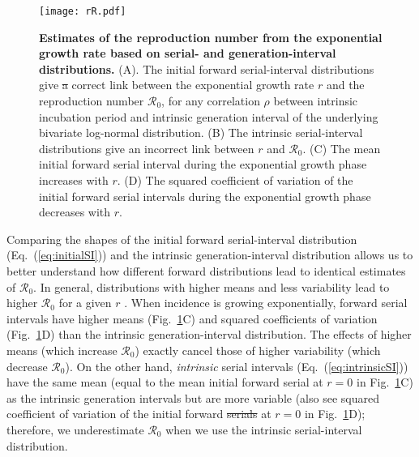 \documentclass[12pt]{article}
\newcommand{\eref}[1]{Eq.~(\ref{eq:#1})}
\newcommand{\fref}[1]{Fig.~\ref{fig:#1}}
\newcommand{\Rx}[1]{\ensuremath{{\mathcal R}_{#1}}\xspace}
\newcommand{\Ro}{\Rx{0}}
\providecommand{\DIFaddtex}[1]{{\protect\color{blue}\uwave{#1}}} %
\providecommand{\DIFdeltex}[1]{{\protect\color{red}\sout{#1}}}                      %
\providecommand{\DIFaddbegin}{} %
\providecommand{\DIFaddend}{} %
\providecommand{\DIFdelbegin}{} %
\providecommand{\DIFdelend}{} %
\providecommand{\DIFaddFL}[1]{\DIFadd{#1}} %
\providecommand{\DIFdelFL}[1]{\DIFdel{#1}} %
\providecommand{\DIFaddbeginFL}{} %
\providecommand{\DIFaddendFL}{} %
\providecommand{\DIFdelbeginFL}{} %
\providecommand{\DIFdelendFL}{} %
\providecommand{\DIFadd}[1]{\texorpdfstring{\DIFaddtex{#1}}{#1}} %
\providecommand{\DIFdel}[1]{\texorpdfstring{\DIFdeltex{#1}}{}} %
\newcommand{\DIFscaledelfig}{0.5}
\newlength{\DIFdelgraphicswidth} %
\newlength{\DIFdelgraphicsheight} %
\newcommand{\DIFaddincludegraphics}[2][]{{\color{blue}\fbox{\DIFOincludegraphics[#1]{#2}}}} %
\newcommand{\DIFdelincludegraphics}[2][]{%
\sbox{\DIFdelgraphicsbox}{\DIFOincludegraphics[#1]{#2}}%
\settoboxwidth{\DIFdelgraphicswidth}{\DIFdelgraphicsbox} %
\settoboxtotalheight{\DIFdelgraphicsheight}{\DIFdelgraphicsbox} %
\scalebox{\DIFscaledelfig}{%
\parbox[b]{\DIFdelgraphicswidth}{\usebox{\DIFdelgraphicsbox}\\[-\baselineskip] \rule{\DIFdelgraphicswidth}{0em}}\llap{\resizebox{\DIFdelgraphicswidth}{\DIFdelgraphicsheight}{%
\setlength{\unitlength}{\DIFdelgraphicswidth}%
\begin{picture}(1,1)%
\thicklines\linethickness{2pt} %
{\color[rgb]{1,0,0}\put(0,0){\framebox(1,1){}}}%
{\color[rgb]{1,0,0}\put(0,0){\line( 1,1){1}}}%
{\color[rgb]{1,0,0}\put(0,1){\line(1,-1){1}}}%
\end{picture}%
}\hspace*{3pt}}} %
} %
\DeclareRobustCommand{\DIFaddbegin}{\DIFOaddbegin \let\includegraphics\DIFaddincludegraphics} %
\DeclareRobustCommand{\DIFaddend}{\DIFOaddend \let\includegraphics\DIFOincludegraphics} %
\DeclareRobustCommand{\DIFdelbegin}{\DIFOdelbegin \let\includegraphics\DIFdelincludegraphics} %
\DeclareRobustCommand{\DIFdelend}{\DIFOaddend \let\includegraphics\DIFOincludegraphics} %
\DeclareRobustCommand{\DIFaddbeginFL}{\DIFOaddbeginFL \let\includegraphics\DIFaddincludegraphics} %
\DeclareRobustCommand{\DIFaddendFL}{\DIFOaddendFL \let\includegraphics\DIFOincludegraphics} %
\DeclareRobustCommand{\DIFdelbeginFL}{\DIFOdelbeginFL \let\includegraphics\DIFdelincludegraphics} %
\DeclareRobustCommand{\DIFdelendFL}{\DIFOaddendFL \let\includegraphics\DIFOincludegraphics} %
\begin{document}
\begin{figure}[!th]
\texttt{[image: rR.pdf]}
\caption{
\textbf{Estimates of the reproduction number from the exponential growth rate based on serial- and generation-interval distributions.}
(A). The initial forward serial-interval distributions give \DIFdelbeginFL \DIFdelFL{a }\DIFdelendFL \DIFaddbeginFL \DIFaddFL{the }\DIFaddendFL correct
link between the exponential growth rate $r$ and the reproduction
number \Ro,
for any correlation $\rho$ between intrinsic incubation period and
intrinsic generation interval of the underlying bivariate log-normal distribution.
(B) The intrinsic serial-interval distributions give an incorrect link between $r$ and \Ro.
(C) The mean initial forward serial interval during the exponential growth phase increases with $r$.
(D) The squared coefficient of variation of the initial forward serial intervals during the exponential growth phase decreases with $r$.
}
\label{fig:rR}
\end{figure}

Comparing the shapes of the initial forward serial-interval distribution (\eref{initialSI}) and the intrinsic generation-interval distribution allows us to better understand how different forward distributions lead to identical estimates of \Ro.
In general, distributions with higher means and less variability lead to higher \Ro for a given $r$ \citep{wallinga2007generation, weitz2015modeling, park2019practical}.
When incidence is growing exponentially, forward serial intervals have higher means (\fref{rR}C) and squared coefficients of variation (\fref{rR}D) than the intrinsic generation-interval distribution.
The effects of higher means (which increase \Ro) exactly cancel those of higher variability (which decrease \Ro).
On the other hand, \emph{intrinsic} serial intervals (\eref{intrinsicSI}) have the same mean (equal to the mean initial forward serial at $r=0$ in \fref{rR}C) as the intrinsic generation intervals but are more variable (also see squared coefficient of variation of the initial forward \DIFdelbegin \DIFdel{serials }\DIFdelend \DIFaddbegin \DIFadd{serial-interval distribution }\DIFaddend at $r=0$ in \fref{rR}D); 
therefore, we underestimate \Ro when we use the intrinsic serial-interval distribution.
\end{document}
